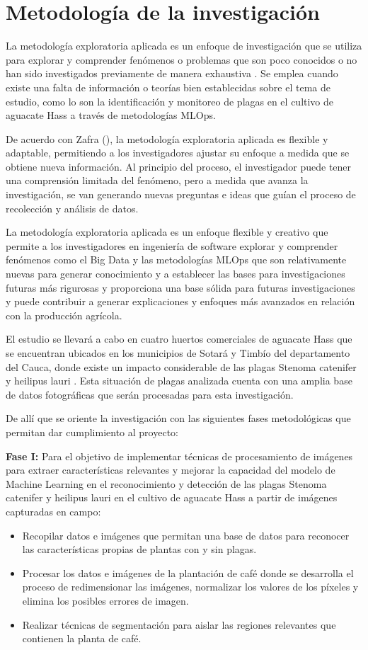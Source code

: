 \section{Metodología de la investigación}
La metodología exploratoria aplicada es un enfoque de investigación que se utiliza para explorar y comprender fenómenos o problemas que son poco conocidos o no han sido investigados previamente de manera exhaustiva \citep{zafra2006}. Se emplea cuando existe una falta de información o teorías bien establecidas sobre el tema de estudio, como lo son la identificación y monitoreo de plagas en el cultivo de aguacate Hass a través de metodologías MLOps.

De acuerdo con Zafra (\citeyear{zafra2006}), la metodología exploratoria aplicada es flexible y adaptable, permitiendo a los investigadores ajustar su enfoque a medida que se obtiene nueva información. Al principio del proceso, el investigador puede tener una comprensión limitada del fenómeno, pero a medida que avanza la investigación, se van generando nuevas preguntas e ideas que guían el proceso de recolección y análisis de datos.

La metodología exploratoria aplicada es un enfoque flexible y creativo que permite a los investigadores en ingeniería de software explorar y comprender fenómenos como el Big Data y las metodologías MLOps que son relativamente nuevas para generar conocimiento y a establecer las bases para investigaciones futuras más rigurosas y proporciona una base sólida para futuras investigaciones y puede contribuir a generar explicaciones y enfoques más avanzados en relación con la producción agrícola.

El estudio se llevará a cabo en cuatro huertos comerciales de aguacate Hass que se encuentran ubicados en los municipios de Sotará y Timbío del departamento del Cauca, donde existe un impacto considerable de las plagas Stenoma catenifer y heilipus lauri \citep{zapata2022}. Esta situación de plagas analizada cuenta con una amplia base de datos fotográficas que serán procesadas para esta investigación.

De allí que se oriente la investigación con las siguientes fases metodológicas que permitan dar cumplimiento al proyecto:

\textbf{Fase I:} Para el objetivo de implementar técnicas de procesamiento de imágenes para extraer características relevantes y mejorar la capacidad del modelo de Machine Learning en el reconocimiento y detección de las plagas Stenoma catenifer y heilipus lauri en el cultivo de aguacate Hass a partir de imágenes capturadas en campo:
\begin{itemize}
    \item Recopilar datos e imágenes que permitan una base de datos para reconocer las características propias de plantas con y sin plagas.
    \item Procesar los datos e imágenes de la plantación de café donde se desarrolla el proceso de redimensionar las imágenes, normalizar los valores de los píxeles y elimina los posibles errores de imagen.
    \item Realizar técnicas de segmentación para aislar las regiones relevantes que contienen la planta de café.
\end{itemize}

